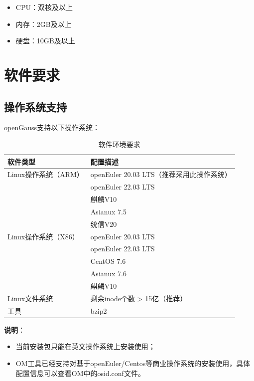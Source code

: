 \documentclass[12pt,UTF8]{ctexbook}
\begin{document}
\begin{itemize}[leftmargin=2cm]
    \item CPU：双核及以上
    \item 内存：2GB及以上
    \item 硬盘：10GB及以上
\end{itemize}

\section{软件要求}

\subsection{操作系统支持}

openGauss支持以下操作系统：

\begin{table}[htbp]
    \centering
    \caption{软件环境要求}
    \label{tab:software_requirements}
    \begin{tabular}{|l|l|}
    \hline
    \textbf{软件类型} & \textbf{配置描述} \\ \hline
    Linux操作系统（ARM） & openEuler 20.03 LTS（推荐采用此操作系统）\\ \hline
    & openEuler 22.03 LTS \\ \hline
    & 麒麟V10 \\ \hline
    & Asianux 7.5 \\ \hline
    & 统信V20 \\ \hline
    Linux操作系统（X86） & openEuler 20.03 LTS \\ \hline
    & openEuler 22.03 LTS \\ \hline
    & CentOS 7.6 \\ \hline
    & Asianux 7.6 \\ \hline
    & 麒麟V10 \\ \hline
    Linux文件系统 & 剩余inode个数 > 15亿（推荐）\\ \hline
    工具 & bzip2 \\ \hline
    \end{tabular}
\end{table}

\textbf{说明}：
\begin{itemize}[leftmargin=2cm]
    \item 当前安装包只能在英文操作系统上安装使用；
    \item OM工具已经支持对基于openEuler/Centos等商业操作系统的安装使用，具体配置信息可以查看OM中的osid.conf文件。
\end{itemize}
\end{document}
